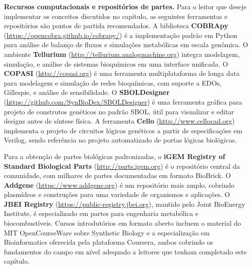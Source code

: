 \textbf{Recursos computacionais e repositórios de partes.} Para o leitor que deseje implementar os conceitos discutidos no capítulo, as seguintes ferramentas e repositórios são pontos de partida recomendados. A biblioteca \textbf{COBRApy} (\url{https://opencobra.github.io/cobrapy/}) é a implementação padrão em Python para análise de balanço de fluxos e simulações metabólicas em escala genômica. O ambiente \textbf{Tellurium} (\url{http://tellurium.analogmachine.org}) integra modelagem, simulação, e análise de sistemas bioquímicos em uma interface unificada. O \textbf{COPASI} (\url{http://copasi.org}) é uma ferramenta multiplataforma de longa data para modelagem e simulação de redes bioquímicas, com suporte a EDOs, Gillespie, e análise de sensibilidade. O \textbf{SBOLDesigner} (\url{https://github.com/SynBioDex/SBOLDesigner}) é uma ferramenta gráfica para projeto de construtos genéticos no padrão SBOL, útil para visualizar e editar designs antes de síntese física. A ferramenta \textbf{Cello} (\url{http://www.cellocad.org}) implementa o projeto de circuitos lógicos genéticos a partir de especificações em Verilog, sendo referência no projeto automatizado de portas lógicas biológicas.

Para a obtenção de partes biológicas padronizadas, o \textbf{iGEM Registry of Standard Biological Parts} (\url{http://parts.igem.org}) é o repositório central da comunidade, com milhares de partes documentadas em formato BioBrick. O \textbf{Addgene} (\url{https://www.addgene.org}) é um repositório mais amplo, cobrindo plasmídeos e construções para uma variedade de organismos e aplicações. O \textbf{JBEI Registry} (\url{https://public-registry.jbei.org}), mantido pelo Joint BioEnergy Institute, é especializado em partes para engenharia metabólica e biocombustíveis. Cursos introdutórios em formato aberto incluem o material do MIT OpenCourseWare sobre Synthetic Biology e a especialização em Bioinformatics oferecida pela plataforma Coursera, ambos cobrindo os fundamentos do campo em nível adequado a leitores que tenham completado este capítulo.

